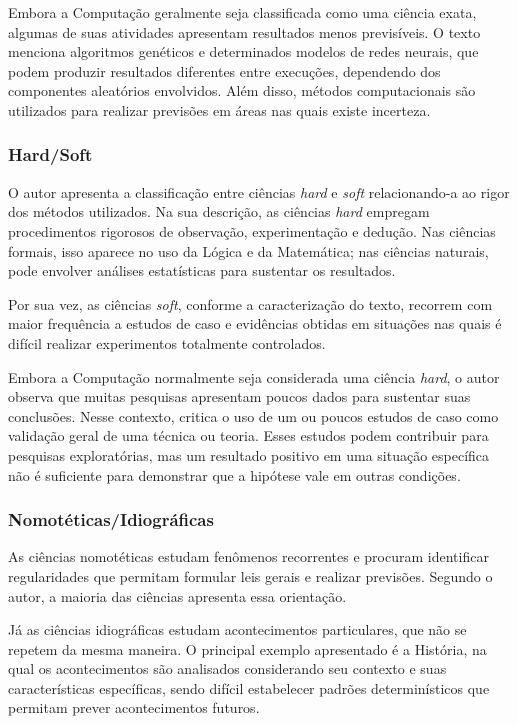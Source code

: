 \documentclass[12pt,a4paper]{article}
\begin{document}
Embora a Computação geralmente seja classificada como uma ciência exata, algumas de suas atividades apresentam resultados menos previsíveis. O texto menciona algoritmos genéticos e determinados modelos de redes neurais, que podem produzir resultados diferentes entre execuções, dependendo dos componentes aleatórios envolvidos. Além disso, métodos computacionais são utilizados para realizar previsões em áreas nas quais existe incerteza.

\subsubsection{Hard/Soft}

O autor apresenta a classificação entre ciências \textit{hard} e \textit{soft} relacionando-a ao rigor dos métodos utilizados. Na sua descrição, as ciências \textit{hard} empregam procedimentos rigorosos de observação, experimentação e dedução. Nas ciências formais, isso aparece no uso da Lógica e da Matemática; nas ciências naturais, pode envolver análises estatísticas para sustentar os resultados.

Por sua vez, as ciências \textit{soft}, conforme a caracterização do texto, recorrem com maior frequência a estudos de caso e evidências obtidas em situações nas quais é difícil realizar experimentos totalmente controlados.

Embora a Computação normalmente seja considerada uma ciência \textit{hard}, o autor observa que muitas pesquisas apresentam poucos dados para sustentar suas conclusões. Nesse contexto, critica o uso de um ou poucos estudos de caso como validação geral de uma técnica ou teoria. Esses estudos podem contribuir para pesquisas exploratórias, mas um resultado positivo em uma situação específica não é suficiente para demonstrar que a hipótese vale em outras condições.

\subsubsection{Nomotéticas/Idiográficas}

As ciências nomotéticas estudam fenômenos recorrentes e procuram identificar regularidades que permitam formular leis gerais e realizar previsões. Segundo o autor, a maioria das ciências apresenta essa orientação.

Já as ciências idiográficas estudam acontecimentos particulares, que não se repetem da mesma maneira. O principal exemplo apresentado é a História, na qual os acontecimentos são analisados considerando seu contexto e suas características específicas, sendo difícil estabelecer padrões determinísticos que permitam prever acontecimentos futuros.
\end{document}

